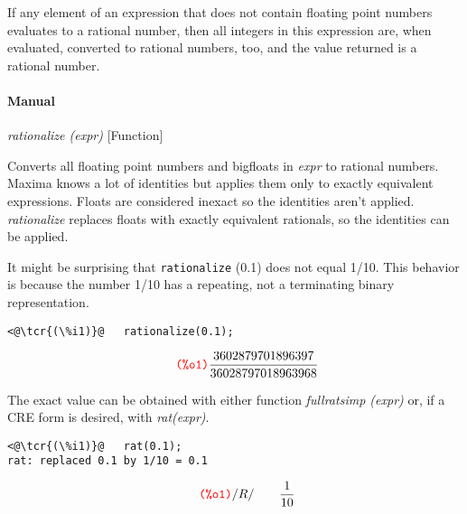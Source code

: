 \documentclass[../Maxima_Workbook.tex]{subfiles}
\begin{document}
\lz If any element of an expression that does not contain floating point numbers evaluates to a rational number, then all integers in this expression are, when evaluated, converted to rational numbers, too, and the value returned is a rational number.

\paragraph{Manual} \mbox{}

\lz \emph{rationalize (expr)} \hfill [Function]

\lz Converts all floating point numbers and bigfloats in \emph{expr} to rational numbers. Maxima knows a lot of identities but applies them only to exactly equivalent expressions. Floats are considered inexact so the identities aren't applied. \emph{rationalize} replaces floats with exactly equivalent rationals, so the identities can be applied.


\lz It might be surprising that \verb|rationalize| (0.1) does not equal 1/10. This behavior is because the number 1/10 has a repeating, not a terminating binary representation.

\lz \begin{small}
	\color{blue} \leqn
\begin{lstlisting}
<@\tcr{(\%i1)}@   rationalize(0.1);
\end{lstlisting} \leqn
\vspace{-4mm} \[\tag*{\tcr{\ttfamily (\%o1)}} \frac{3602879701896397}{36028797018963968} \]
\color{black} \reqn
\end{small} \vspace{-4mm}

\begin{remark}
	The exact value can be obtained with either function \emph{fullratsimp (expr)} or, if a CRE form is desired, with \emph{rat(expr)}.
\end{remark}

\lz \begin{small}
	\color{blue} \leqn
\begin{lstlisting}
<@\tcr{(\%i1)}@   rat(0.1);
rat: replaced 0.1 by 1/10 = 0.1
\end{lstlisting}
\vspace{-4mm} \[\tag*{\tcr{\ttfamily (\%o1)}} /R/ \qquad \frac{1}{10} \]
\vspace{-4mm}
\color{black} \reqn
\end{small} \vspace{-4mm}
\end{document}
